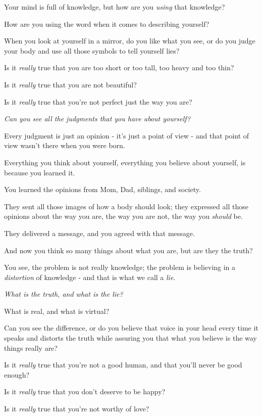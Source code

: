 \documentclass{article}
\numberwithin{equation}{section}
\begin{document}
%
Your mind is full of knowledge, but how are you \textit{using} that knowledge?

How are you using the word when it comes to describing yourself?

When you look at yourself in a mirror, do you like what you see, or do you judge your body and use all those symbols to tell yourself lies?

Is it \textit{really} true that you are too short or too tall, too heavy and too thin?

Is it \textit{really} true that you are not beautiful?

Is it \textit{really} true that you're not perfect just the way you are?

%
\textit{Can you see all the judgments that you have about yourself?}

Every judgment is just an opinion - it's just a point of view - and that point of view wasn't there when you were born.

Everything you think about yourself, everything you believe about yourself, is because you learned it.

You learned the opinions from Mom, Dad, siblings, and society.

They sent all those images of how a body should look; they expressed all those opinions about the way you are, the way you are not, the way you \textit{should} be.

They delivered a message, and you agreed with that message.

And now you think so many things about what you are, but are they the truth?

%
You see, the problem is not really knowledge; the problem is believing in a \textit{distortion} of knowledge - and that is what we call a \textit{lie}.

\textit{What is the truth, and what is the lie?}

What is real, and what is virtual?

Can you see the difference, or do you believe that voice in your head every time it speaks and distorts the truth while assuring you that what you believe is the way things really are?

Is it \textit{really} true that you're not a good human, and that you'll never be good enough?

Is it \textit{really} true that you don't deserve to be happy?

Is it \textit{really} true that you're not worthy of love?
\end{document}
